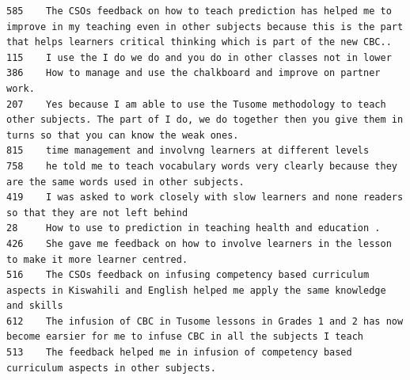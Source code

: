 \documentclass[11pt]{article}
\begin{document}
    \begin{Verbatim}[commandchars=\\\{\}]
585    The CSOs feedback on how to teach prediction has helped me to improve in my teaching even in other subjects because this is the part that helps learners critical thinking which is part of the new CBC..
115    I use the I do we do and you do in other classes not in lower                                                                                                                                            
386    How to manage and use the chalkboard and improve on partner work.                                                                                                                                        
207    Yes because I am able to use the Tusome methodology to teach other subjects. The part of I do, we do together then you give them in turns so that you can know the weak ones.                            
815    time management and involvng learners at different levels                                                                                                                                                
758    he told me to teach vocabulary words very clearly because they are the same words used in other subjects.                                                                                                
419    I was asked to work closely with slow learners and none readers so that they are not left behind                                                                                                         
28     How to use to prediction in teaching health and education .                                                                                                                                              
426    She gave me feedback on how to involve learners in the lesson to make it more learner centred.                                                                                                           
516    The CSOs feedback on infusing competency based curriculum aspects in Kiswahili and English helped me apply the same knowledge and skills                                                                 
612    The infusion of CBC in Tusome lessons in Grades 1 and 2 has now become earsier for me to infuse CBC in all the subjects I teach                                                                          
513    The feedback helped me in infusion of competency based curriculum aspects in other subjects.                                                                                                             

\end{Verbatim}
\end{document}
